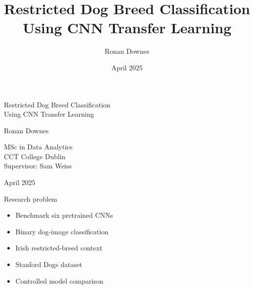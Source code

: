 \documentclass[aspectratio=169,11pt]{beamer}
\title[Restricted Dog Classification]
{Restricted Dog Breed Classification\\Using CNN Transfer Learning}
\author{Ronan Downes}
\institute{
  MSc in Data Analytics\\
  CCT College Dublin\\[0.25em]
  Supervisor: Sam Weiss
}
\date{April 2025}
\newcommand{\stepitem}{\item<+->}
\newcommand{\stepitem}{\item}
\newcommand{\bigbulletlist}{
  \setlength{\itemsep}{0.62em}
  \setlength{\parskip}{0pt}
}
\begin{document}

\begin{frame}

\centering

\vspace*{0.55cm}

{
 \color{projectblue}
 {\Huge Restricted Dog Breed Classification\\[0.28em]
 Using CNN Transfer Learning
}}

\vspace{1.05em}
 {\LARGE
{
 Ronan Downes
}

\vspace{0.78em}

{
 MSc in Data Analytics\\
 CCT College Dublin\\[0.20em]
 Supervisor: Sam Weiss
}}

\vspace{0.78em}

{
 April 2025
}

\end{frame}


\begin{frame}{Research problem}

\vspace{-0.3em}

\begin{itemize}
  \bigbulletlist

  \stepitem Benchmark six pretrained CNNs
  \stepitem Binary dog-image classification
  \stepitem Irish restricted-breed context
  \stepitem Stanford Dogs dataset
  \stepitem Controlled model comparison
\end{itemize}

\end{frame}

%
\end{document}
